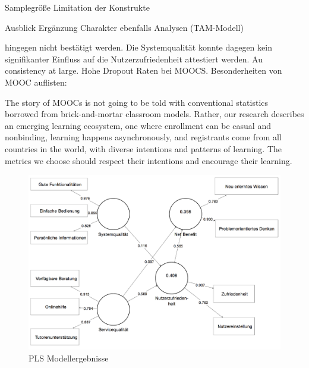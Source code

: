 Samplegröße
Limitation der Konstrukte

Ausblick
Ergänzung 
Charakter ebenfalls Analysen (TAM-Modell)



  hingegen nicht bestätigt werden. Die Systemqualität konnte dagegen kein signifikanter Einfluss auf die Nutzerzufriedenheit attestiert werden. Au 
\todo consistency at large. 
Hohe Dropout Raten bei MOOCS. Besonderheiten von MOOC auflisten: 


The story of MOOCs is not going to be told with conventional statistics borrowed from brick-and-mortar classroom models. Rather, our research describes an emerging learning ecosystem, one where enrollment can be casual and nonbinding, learning happens asynchronously, and registrants come from all countries in the world, with diverse intentions and patterns of learning. The metrics we choose should respect their intentions and encourage their learning.\parencite{reich2014tricky}


\begin{figure}[h]
\centering
\includegraphics[width=1\textwidth]{Grafiken/pls_bw_3.png}
\caption{PLS Modellergebnisse}
\label{PLS Modellergebnisse}
\end{figure}